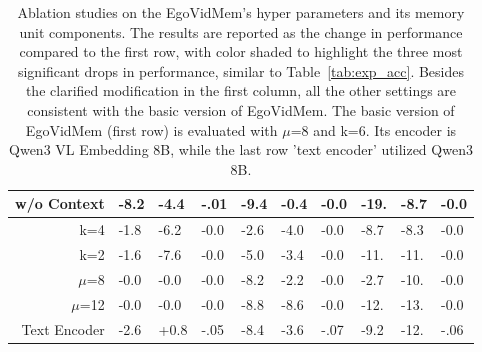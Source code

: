 \begin{table}[htbp]
\begin{tabular}{r|p{0.5cm}<{\centering}p{0.5cm}<{\centering}p{0.5cm}<{\centering}|p{0.5cm}<{\centering}p{0.5cm}<{\centering}p{0.5cm}<{\centering}|p{0.5cm}<{\centering}p{0.5cm}<{\centering}p{0.5cm}<{\centering}}
        w/o Context      & -8.2\cellcolor{second!60}& -4.4                     & -.01                     & -9.4\cellcolor{second!60}& -0.4                     & -0.0                     & -19.\cellcolor{second!60}& -8.7                     & -0.0                     \\ \hline
        k=4              & -1.8                     & -6.2\cellcolor{third!60} & -0.0                     & -2.6                     & -4.0                     & -0.0                     & -8.7                     & -8.3                     & -0.0                     \\ 
        k=2              & -1.6                     & -7.6\cellcolor{second!60}& -0.0                     & -5.0                     & -3.4                     & -0.0                     & -11.                     & -11.                     & -0.0                     \\ \hline
        $\mu$=8          & -0.0                     & -0.0                     & -0.0                     & -8.2                     & -2.2                     & -0.0                     & -2.7                     & -10.                     & -0.0                     \\
        $\mu$=12         & -0.0                     & -0.0                     & -0.0                     & -8.8\cellcolor{third!60} & -8.6\cellcolor{second!60}& -0.0                     & -12.\cellcolor{third!60} & -13.\cellcolor{third!60} & -0.0                     \\ \hline
        Text Encoder     & -2.6\cellcolor{third!60} & +0.8                     & -.05\cellcolor{first!60} & -8.4                     & -3.6                     & -.07\cellcolor{first!60} & -9.2                     & -12.                     & -.06\cellcolor{first!60} \\ \hline
    \end{tabular}
    \caption{
        Ablation studies on the EgoVidMem's hyper parameters and its memory unit components. 
        The results are reported as the change in performance compared to the first row, with color shaded to highlight the three most significant drops in performance, similar to Table~\ref{tab:exp_acc}.
        Besides the clarified modification in the first column, all the other settings are consistent with the basic version of EgoVidMem.
        The basic version of EgoVidMem (first row) is evaluated with $\mu$=8 and k=6. Its encoder is Qwen3 VL Embedding 8B, while the last row 'text encoder' utilized Qwen3 8B.
    }
    \label{tab:ablation}
\end{table}